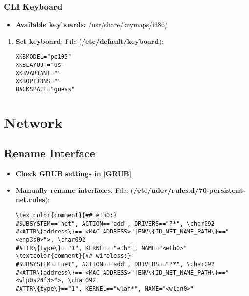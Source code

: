 \documentclass[10pt, a4paper, onecolumn, openany]{book} %
\begin{document}
\subsection{CLI Keyboard}
\begin{itemize}
    \item \textbf{Available keyboards:}
    \newline \textcolor{dir}{/usr/share/keymaps/i386/}
\end{itemize}
\begin{enumerate}
    \item \textbf{Set keyboard:}
\newline File (\textbf{\textcolor{file}{/etc/default/keyboard}}):
\begin{Verbatim}[commandchars=\\\{\}]
XKBMODEL="pc105"
XKBLAYOUT="us"
XKBVARIANT=""
XKBOPTIONS=""
BACKSPACE="guess"
\end{Verbatim}
\end{enumerate}
\chapter{Network}
\section{Rename Interface}
\begin{itemize}
    \item \textbf{Check GRUB settings in \underline{\textbf{\ref{GRUB}}}}
    \item \textbf{Manually rename interfaces:}
\newline File: (\textcolor{file}{\textbf{/etc/udev/rules.d/70-persistent-net.rules}}):
\begin{Verbatim}[commandchars=\\\{\}]
\textcolor{comment}{## eth0:}
#SUBSYSTEM=="net", ACTION=="add", DRIVERS=="?*", \char092
#<ATTR\{address\}=="<MAC-ADDRESS>"|ENV\{ID_NET_NAME_PATH\}=="<enp3s0>">, \char092
#ATTR\{type\}=="1", KERNEL=="eth*", NAME="<eth0>"
\textcolor{comment}{## wireless:}
#SUBSYSTEM=="net", ACTION=="add", DRIVERS=="?*", \char092
#<ATTR\{address\}=="<MAC-ADDRESS>"|ENV\{ID_NET_NAME_PATH\}=="<wlp0s20f3>">, \char092
#ATTR\{type\}=="1", KERNEL=="wlan*", NAME="<wlan0>"
\end{Verbatim}
\end{itemize}
\end{document}
